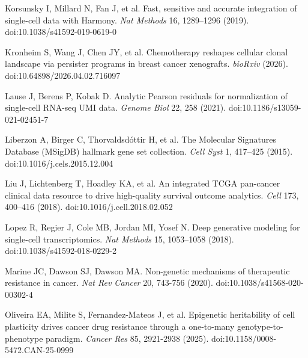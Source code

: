 \documentclass[11pt,a4paper]{article}
\begin{document}
\noindent Korsunsky I, Millard N, Fan J, et al. Fast, sensitive and accurate integration of single-cell data with Harmony. \emph{Nat Methods} 16, 1289--1296 (2019). doi:10.1038/s41592-019-0619-0\par\vspace{2pt}

\noindent Kronheim S, Wang J, Chen JY, et al. Chemotherapy reshapes cellular clonal landscape via persister programs in breast cancer xenografts. \emph{bioRxiv} (2026). doi:10.64898/2026.04.02.716097 \par\vspace{2pt}

\noindent Lause J, Berens P, Kobak D. Analytic Pearson residuals for normalization of single-cell RNA-seq UMI data. \emph{Genome Biol} 22, 258 (2021). doi:10.1186/s13059-021-02451-7\par\vspace{2pt}

\noindent Liberzon A, Birger C, Thorvaldsd\'ottir H, et al. The Molecular Signatures Database (MSigDB) hallmark gene set collection. \emph{Cell Syst} 1, 417--425 (2015). doi:10.1016/j.cels.2015.12.004\par\vspace{2pt}

\noindent Liu J, Lichtenberg T, Hoadley KA, et al. An integrated TCGA pan-cancer clinical data resource to drive high-quality survival outcome analytics. \emph{Cell} 173, 400--416 (2018). doi:10.1016/j.cell.2018.02.052\par\vspace{2pt}

\noindent Lopez R, Regier J, Cole MB, Jordan MI, Yosef N. Deep generative modeling for single-cell transcriptomics. \emph{Nat Methods} 15, 1053--1058 (2018). doi:10.1038/s41592-018-0229-2\par\vspace{2pt}

\noindent Marine JC, Dawson SJ, Dawson MA. Non-genetic mechanisms of therapeutic resistance in cancer. \emph{Nat Rev Cancer} 20, 743-756 (2020). doi:10.1038/s41568-020-00302-4\par\vspace{2pt}

\noindent Oliveira EA, Milite S, Fernandez-Mateos J, et al. Epigenetic heritability of cell plasticity drives cancer drug resistance through a one-to-many genotype-to-phenotype paradigm. \emph{Cancer Res} 85, 2921-2938 (2025). doi:10.1158/0008-5472.CAN-25-0999 \par\vspace{2pt}
\end{document}
